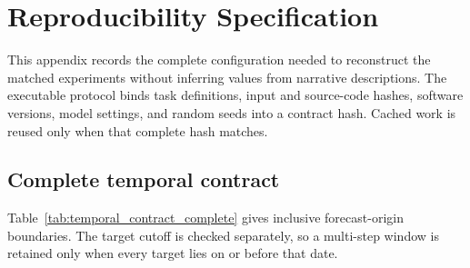 \section{Reproducibility Specification}
\label{app:hyperparameters}

This appendix records the complete configuration needed to reconstruct the
matched experiments without inferring values from narrative descriptions.
The executable protocol binds task definitions, input and source-code hashes,
software versions, model settings, and random seeds into a contract hash.
Cached work is reused only when that complete hash matches.

\subsection{Complete temporal contract}

Table~\ref{tab:temporal_contract_complete} gives inclusive forecast-origin
boundaries. The target cutoff is checked separately, so a multi-step window is
retained only when every target lies on or before that date.

